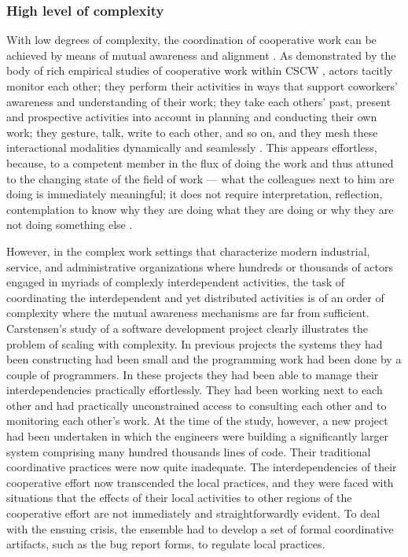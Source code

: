 \subsubsection{High level of complexity} %
\label{ssub:high_level_of_complexity}
With low degrees of complexity, the coordination of cooperative work can be achieved by means of mutual awareness and alignment \cite{schmidt2002remarks}. As demonstrated by the body of rich empirical studies of cooperative work within CSCW \cite{heath1992collaboration,heath2002a}, actors tacitly monitor each other; they perform their activities in ways that support coworkers' awareness and understanding of their work; they take each others' past, present and prospective activities into account in planning and conducting their own work; they gesture, talk, write to each other, and so on, and they mesh these interactional modalities dynamically and seamlessly . This appears effortless, because, to a competent member in the flux of doing the work and thus attuned to the changing state of the field of work — what the colleagues next to him are doing is immediately meaningful; it does not require interpretation, reflection, contemplation to know why they are doing what they are doing or why they are not doing something else \cite{schmidt2002remarks}.

However, in the complex work settings that characterize modern industrial, service, and administrative organizations where hundreds or thousands of actors engaged in myriads of complexly interdependent activities, the task of coordinating the interdependent and yet distributed activities is of an order of complexity where the mutual awareness mechanisms are far from sufficient. Carstensen’s study of a software development project  \cite{carstensen1994we} clearly illustrates the problem of scaling with complexity. In previous projects the systems they had been constructing had been small and the programming work had been done by a couple of programmers. In these projects they had been able to manage their interdependencies practically effortlessly. They had been working next to each other and had practically unconstrained access to consulting each other and to monitoring each other’s work. At the time of the study, however, a new project had been undertaken in which the engineers were building a significantly larger system comprising many hundred thousands lines of code. Their traditional coordinative practices were now quite inadequate. The interdependencies of their cooperative effort now transcended the local practices, and they were faced with situations that the effects of their local activities to other regions of the cooperative effort are not immediately and straightforwardly evident. To deal with the ensuing crisis, the ensemble had to develop a set of formal coordinative artifacts, such as the bug report forms, to regulate local practices.

